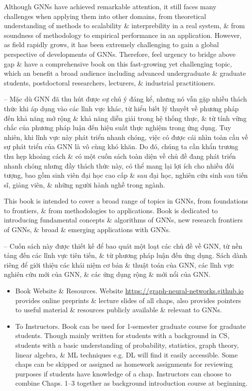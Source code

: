\documentclass{article}
\begin{document}
\begin{itemize}
    Although GNNs have achieved remarkable attention, it still faces many challenges when applying them into other domains, from theoretical understanding of methods to scalability \& interprebility in a real system, \& from soundness of methodology to empirical performance in an application. However, as field rapidly grows, it has been extremely challenging to gain a global perspective of developments of GNNs. Therefore, feel urgency to bridge above gap \& have a comprehensive book on this fast-growing yet challenging topic, which an benefit a broad audience including advanced undergraduate \& graduate students, postdoctoral researchers, lecturers, \& industrial practitioners.

    -- Mặc dù GNN đã thu hút được sự chú ý đáng kể, nhưng nó vẫn gặp nhiều thách thức khi áp dụng vào các lĩnh vực khác, từ hiểu biết lý thuyết về phương pháp đến khả năng mở rộng \& khả năng diễn giải trong hệ thống thực, \& từ tính vững chắc của phương pháp luận đến hiệu suất thực nghiệm trong ứng dụng. Tuy nhiên, khi lĩnh vực này phát triển nhanh chóng, việc có được cái nhìn toàn cầu về sự phát triển của GNN là vô cùng khó khăn. Do đó, chúng ta cần khẩn trương thu hẹp khoảng cách \& có một cuốn sách toàn diện về chủ đề đang phát triển nhanh chóng nhưng đầy thách thức này, có thể mang lại lợi ích cho nhiều đối tượng, bao gồm sinh viên đại học cao cấp \& sau đại học, nghiên cứu sinh sau tiến sĩ, giảng viên, \& những người hành nghề trong ngành.

    This book is intended to cover a broad range of topics in GNNs, from foundations to frontiers, \& from methodologies to applications. Book is dedicated to introducing fundamental concepts \& algorithms of GNNs, new research frontiers of GNNs, \& broad \& emerging applications with GNNs.

    -- Cuốn sách này được thiết kế để bao quát một loạt các chủ đề về GNN, từ nền tảng đến các lĩnh vực tiên tiến, \& từ phương pháp luận đến ứng dụng. Sách dành riêng để giới thiệu các khái niệm cơ bản \& thuật toán của GNN, các lĩnh vực nghiên cứu mới của GNN, \& các ứng dụng rộng \& mới nổi của GNN.
    \begin{itemize}
        \item {\sf Book Website \& Resources.} Website \url{https://graph-neural-networks.github.io} provides online preprints \& lecture slides of all chaps, also provides pointers to useful material \& resources publicly available \& relevant to GNNs.
        \item {\sf To Instructors.} Book can be used for 1-semester graduate course for graduate students. Though mainly written for students with a background in CS, students with a basic understanding of probability, statistics, graph theory, linear algebra, \& ML techniques e.g. DL will find it easily accessible. Some chaps can be skipped or assigned as homework assignments for reviewing purposes if students have knowledge of a chap. Instructors can choose to combine Chaps. 1--3 together as background introduction course at beginning.


\end{itemize}
\end{itemize}
\end{document}
